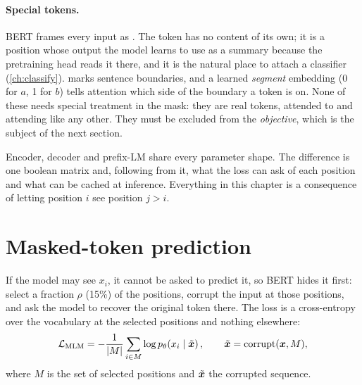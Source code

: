 \paragraph{Special tokens.} BERT frames every input as . The
\code{[CLS]} token has no content of its own; it is a position whose output the model learns to use as
a summary because the pretraining head reads it there, and it is the natural place to attach a
classifier (\cref{ch:classify}). \code{[SEP]} marks sentence boundaries, and a learned
\emph{segment} embedding (0 for $a$, 1 for $b$) tells attention which side of the boundary a token is
on. None of these needs special treatment in the mask: they are real tokens, attended to and attending
like any other. They must be excluded from the \emph{objective}, which is the subject of the next
section.

\begin{keyidea}
Encoder, decoder and prefix-LM share every parameter shape. The difference is one boolean matrix
and, following from it, what the loss can ask of each position and what can be cached at inference.
Everything in this chapter is a consequence of letting position $i$ see position $j>i$.
\end{keyidea}

\section{Masked-token prediction}\label{sec:encoders:mlm}

If the model may see $x_i$, it cannot be asked to predict it, so BERT hides it first: select a
fraction $\rho$ (15\%) of the positions, corrupt the input at those positions, and ask the model to
recover the original token there. The loss is a cross-entropy over the vocabulary at the selected
positions and nothing elsewhere:
\begin{equation}
\mathcal{L}_\text{MLM} = -\frac{1}{|M|}\sum_{i\in M}\log p_\theta\!\left(x_i \mid \tilde{\bm{x}}\right),
\qquad \tilde{\bm{x}} = \text{corrupt}(\bm{x}, M),
\label{eq:encoders:mlm}
\end{equation}
where $M$ is the set of selected positions and $\tilde{\bm{x}}$ the corrupted sequence.


